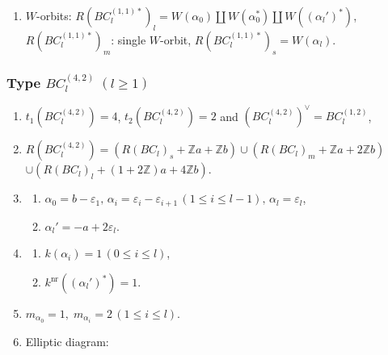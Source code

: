 \documentclass[11pt]{amsart}
\newcommand{\Z}{\mathbb{Z}}
\newcommand{\nr}{\mathrm{nr}}
\newcommand{\vep}{\varepsilon}
\begin{document}
{\begin{enumerate}
\begin{center}
{}
\end{center}

\item $W$-orbits: $R(BC_l^{(1,1)\ast})_l=W(\alpha_0) \amalg W(\alpha_0^\ast) \amalg W((\alpha_l')^\ast)$, \\
\phantom{$W$-orbits:} $R(BC_l^{(1,1)\ast})_m$: single $W$-orbit, \quad $R(BC_l^{(1,1)\ast})_s=W(\alpha_l)$.
\end{enumerate}

\subsubsection{Type $BC_l^{(4,2)}\; (l\geq 1)$}\label{data:BC-3}
\begin{enumerate}
\item $t_1(BC_l^{(4,2)})=4$, \; $t_2(BC_l^{(4,2)})=2$ and  
$(BC_l^{(4,2)})^\vee=BC_l^{(1,2)}$,
\item $R(BC_l^{(4,2)})=(R(BC_l)_s+\Z a+\Z b) \cup (R(BC_l)_m+\Z a+2\Z b)$ \\
 $\cup (R(BC_l)_l+(1+2\Z)a+4\Z b)$.
\item 
\begin{enumerate}
\item[i)] $\alpha_0=b-\vep_1, \, \alpha_i=\vep_i-\vep_{i+1}\, 
(1\leq i\leq l-1), \, \alpha_l=\vep_l$, 
\item[ii)] $\alpha_l'= -a+2\vep_l$.
\end{enumerate}
\item
\begin{enumerate}
\item[i)] $k(\alpha_i)=1\, (0\leq i\leq l)$, 
\item[ii)] $k^{\nr}((\alpha_l')^\ast)=1$. 
\end{enumerate}
\item $m_{\alpha_0}=1, \; m_{\alpha_i}=2\, (1\leq i\leq l)$.
\item Elliptic diagram:
\begin{center}
\end{center}
\end{enumerate}}
\end{document}
